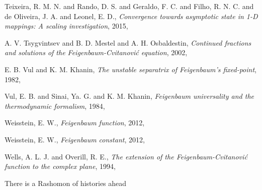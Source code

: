 \begin{description}
{Teixeira, R. M. N. and Rando, D. S. and Geraldo, F. C. and Filho, R. N. C. and de Oliveira, J. A. and Leonel, E. D.},
{\em Convergence towards asymptotic state in {1-D} mappings: {A} scaling investigation},
{2015},

{A. V. Tsygvintsev and B. D. Mestel and A. H. Osbaldestin},
{\em Continued fractions and solutions of the {Feigenbaum-Cvitanovi{\'{c}}} equation},
{2002},

{E. B. Vul and K. M. Khanin},
{\em The unstable separatrix of {Feigenbaum}'s fixed-point},
{1982},

{Vul, E. B. and Sinai, Ya. G. and K. M. Khanin},
{\em Feigenbaum universality and the thermodynamic formalism},
{1984},

{Weisstein, E. W.},
{\em Feigenbaum function},
{2012},

{Weisstein, E. W.},
{\em Feigenbaum constant},
{2012},

{Wells, A. L. J. and Overill, R. E.},
{\em The extension of the {Feigenbaum-Cvitanovi{\'c}} function to the complex plane},
{1994},

\end{description}


There is a Rashomon of histories ahead

